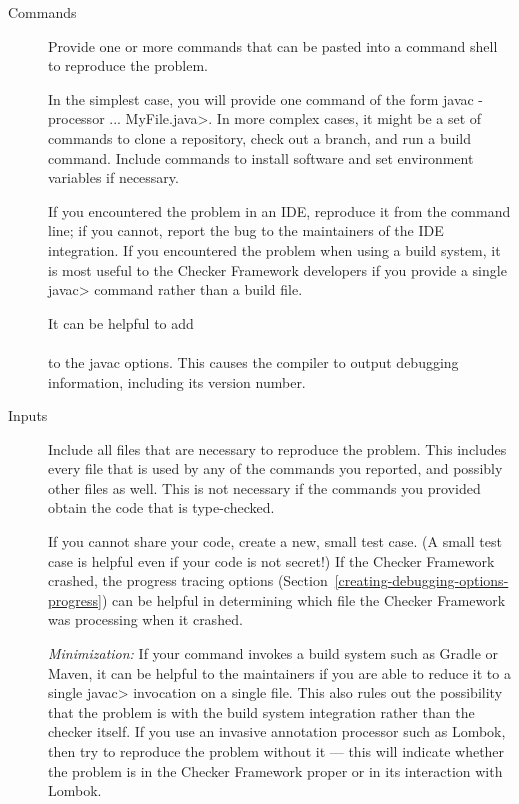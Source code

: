 \begin{description}
\item[Commands]
  Provide one or more commands that can be pasted into a command shell to
  reproduce the problem.

  In the simplest case, you will provide one command of
  the form \<javac -processor ... MyFile.java>.  In more complex cases, it
  might be a set of commands to clone a repository, check out a branch, and
  run a build command.  Include commands to install software and set
  environment variables if necessary.

  If you encountered the problem in an IDE, reproduce it from the command
  line; if you cannot, report the bug to the maintainers of the IDE integration.
  If you encountered the problem when using a build system, it is most
  useful to the Checker Framework developers if you provide a single
  \<javac> command rather than a build file.

  It can be helpful to add \\
   \\
  to the javac options.  This causes the
  compiler to output debugging information, including its version number.

\item[Inputs]
  Include all files that are necessary to reproduce the problem.  This
  includes every file that is used by any of the commands you reported, and
  possibly other files as well.  This is not necessary if the commands you
  provided obtain the code that is type-checked.

  If you cannot share your code, create a new, small test case.  (A small
  test case is helpful even if your code is not secret!)  If the Checker
  Framework crashed, the progress tracing options
  (Section~\ref{creating-debugging-options-progress}) can be helpful in
  determining which file the Checker Framework was processing when it
  crashed.

  \emph{Minimization:}
  If your command invokes a build system such as Gradle or Maven, it can be
  helpful to the maintainers if you are able to reduce it to a single
  \<javac> invocation on a single file.
  This also rules out the possibility that the problem is with the build system
  integration rather than the checker itself.
  If you use an invasive
  annotation processor such as Lombok, then try to reproduce the problem
  without it --- this will indicate whether the problem is in the Checker
  Framework proper or in its interaction with Lombok.


\end{description}
